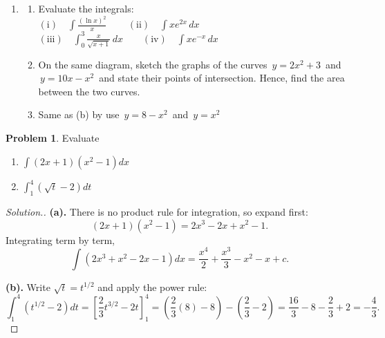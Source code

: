 \documentclass[11pt,a4paper]{article}
\theoremstyle{definition}
\newtheorem{problemx}{Problem}[section]
\newenvironment{problem}{\begin{problemx}}{\end{problemx}}
\newenvironment{solution}
  {\renewcommand{\qedsymbol}{}\begin{proof}[\textit{Solution}.]}
  {\end{proof}}
\begin{document}
\begin{enumerate}
\item
\begin{enumerate}
      \item Evaluate the integrals:\\
      
      $(\text{i})\quad  \displaystyle{\int \frac{\left(\ln x\right)^2}{x}\, \qquad  (\text{ii})\quad  \int xe^{2x}\,dx}$\\
      
      $(\text{iii})\quad  \displaystyle{\int^3_0\frac{x}{\sqrt{x + 1}}\,dx\qquad  (\text{iv})\quad  \int xe^{-x}\,dx}$
   
      
      \item On the same diagram, sketch the graphs of the curves $\, y = 2x^2 + 3\,$ and $\, y = 10x - x^2\,$ and state their points of intersection. Hence, find the area between the two curves.
      
      \item Same as (b) by use $\, y = 8 - x^2\,$ and $\, y = x^2$
\end{enumerate}
\end{enumerate}



























\pagebreak

\begin{problem}
Evaluate
\begin{enumerate}
\item[(a).] $\displaystyle\int (2x+1)\left(x^{2}-1\right)dx$
\item[(b).] $\displaystyle\int^{4}_{1}\left(\sqrt{t}-2\right)dt$
\end{enumerate}
\end{problem}

\begin{solution}
\textbf{(a).} There is no product rule for integration, so expand first:
$$(2x+1)\left(x^{2}-1\right)=2x^{3}-2x+x^{2}-1 .$$
Integrating term by term,
$$\int\left(2x^{3}+x^{2}-2x-1\right)dx
=\frac{x^{4}}{2}+\frac{x^{3}}{3}-x^{2}-x+c .$$

\textbf{(b).} Write $\sqrt{t}=t^{1/2}$ and apply the power rule:
$$\int^{4}_{1}\left(t^{1/2}-2\right)dt
=\left[\frac{2}{3}t^{3/2}-2t\right]^{4}_{1}
=\left(\frac{2}{3}(8)-8\right)-\left(\frac{2}{3}-2\right)
=\frac{16}{3}-8-\frac{2}{3}+2=-\frac{4}{3}.$$
\end{solution}
\end{document}
